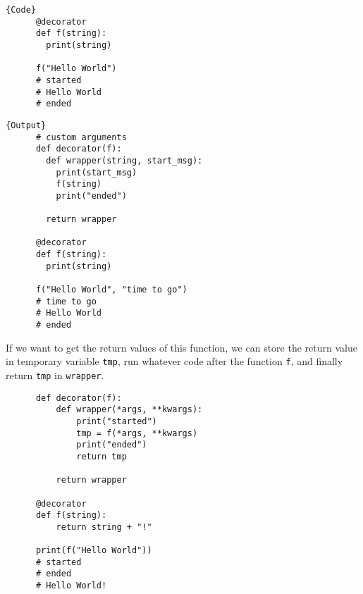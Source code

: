 \documentclass{article}
\begin{document}
\begin{definition}[Decorators]
\begin{minipage}{.5\textwidth}
\begin{lstlisting}[]{Code}
      @decorator
      def f(string): 
        print(string) 

      f("Hello World")
      # started
      # Hello World
      # ended
    \end{lstlisting}
    \end{minipage}
    \hfill
    \begin{minipage}{.49\textwidth}
    \begin{lstlisting}[]{Output}
      # custom arguments 
      def decorator(f): 
        def wrapper(string, start_msg): 
          print(start_msg) 
          f(string)
          print("ended") 

        return wrapper

      @decorator
      def f(string): 
        print(string) 

      f("Hello World", "time to go")
      # time to go
      # Hello World
      # ended
    \end{lstlisting}
    \end{minipage}
    If we want to get the return values of this function, we can store the return value in temporary variable \texttt{tmp}, run whatever code after the function \texttt{f}, and finally return \texttt{tmp} in \texttt{wrapper}. 

    \begin{lstlisting}
      def decorator(f): 
          def wrapper(*args, **kwargs): 
              print("started") 
              tmp = f(*args, **kwargs)
              print("ended") 
              return tmp

          return wrapper

      @decorator
      def f(string): 
          return string + "!"

      print(f("Hello World"))
      # started
      # ended
      # Hello World!
    \end{lstlisting}
  \end{definition}
\end{document}
